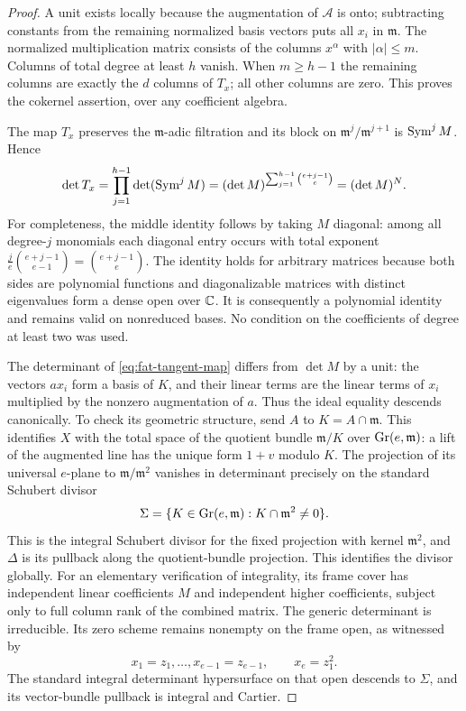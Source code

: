 \begin{proof}
A unit exists locally because the augmentation of $\mathcal A$ is
onto; subtracting constants from the remaining normalized basis
vectors puts all $x_i$ in $\mathfrak m$. The normalized multiplication
matrix consists of the columns $x^\alpha$ with $|\alpha|\le m$.
Columns of total degree at least $h$ vanish. When $m\ge h-1$ the
remaining columns are exactly the $d$ columns of $T_x$; all other
columns are zero. This proves the cokernel assertion, over any
coefficient algebra.

The map $T_x$ preserves the $\mathfrak m$-adic filtration and its
block on $\mathfrak m^j/\mathfrak m^{j+1}$ is $\operatorname{Sym}^j M$. Hence
\[
 \det T_x=\prod_{j=1}^{h-1}\det(\operatorname{Sym}^j M)
          =(\det M)^{\sum_{j=1}^{h-1}\binom{e+j-1}{e}}
          =(\det M)^N.
\]
For completeness, the middle identity follows by taking $M$ diagonal:
among all degree-$j$ monomials each diagonal entry occurs with total
exponent $\frac je\binom{e+j-1}{e-1}=\binom{e+j-1}{e}$.
The identity holds for arbitrary matrices because both sides are
polynomial functions and diagonalizable matrices with distinct
eigenvalues form a dense open over $\mathbb C$. It is consequently a
polynomial identity and remains valid on nonreduced bases.
No condition on the coefficients of degree at least two was used.

The determinant of \eqref{eq:fat-tangent-map} differs from $\det M$
by a unit: the vectors $ax_i$ form a basis of $K$, and their linear
terms are the linear terms of $x_i$ multiplied by the nonzero
augmentation of $a$. Thus the ideal equality descends canonically.
To check its geometric structure, send $A$ to $K=A\cap\mathfrak m$.
This identifies $X$ with the total space of the quotient bundle
$\mathfrak m/K$ over $\operatorname{Gr}(e,\mathfrak m)$: a lift of the augmented
line has the unique form $1+v$ modulo $K$. The projection of its universal $e$-plane to
$\mathfrak m/\mathfrak m^2$ vanishes in determinant precisely on the
standard Schubert divisor
\[
 \Sigma=\{K\in\operatorname{Gr}(e,\mathfrak m):K\cap\mathfrak m^2\ne0\}.
\]
This is the integral Schubert divisor for the fixed projection with
kernel $\mathfrak m^2$, and $\Delta$ is its pullback along the
quotient-bundle projection. This identifies the divisor globally.
For an elementary verification of integrality, its frame cover has
independent linear coefficients $M$ and independent higher coefficients,
subject only to full column rank of the combined matrix. The generic
determinant is irreducible. Its zero scheme remains nonempty on the
frame open, as witnessed by
\[
 x_1=z_1,\ldots,x_{e-1}=z_{e-1},\qquad x_e=z_1^2.
\]
The standard integral determinant hypersurface on that open descends
to $\Sigma$, and its vector-bundle pullback is integral and Cartier.


\end{proof}

